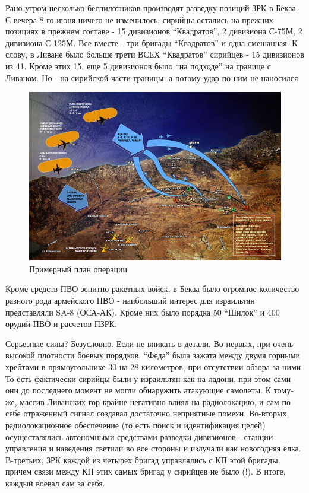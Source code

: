 Рано утром несколько беспилотников производят разведку позиций ЗРК в Бекаа. С вечера 8-го июня ничего не изменилось, сирийцы остались на прежних позициях в прежнем составе - 15 дивизионов “Квадратов”, 2 дивизиона С-75М, 2 дивизиона С-125М. Все вместе - три бригады “Квадратов” и одна смешанная. К слову, в Ливане было больше трети ВСЕХ “Квадратов” сирийцев - 15 дивизионов из 41. Кроме этих 15, еще 5 дивизионов было “на подходе” на границе с Ливаном. Но - на сирийской части границы, а потому удар по ним не наносился.

\begin{figure}[h!tb] 
	\centering\includegraphics[scale=0.3]{Bekaa_2/9zyt2hCclcQ.jpg}
	\caption{Примерный план операции}
\end{figure}	

Кроме средств ПВО зенитно-ракетных войск, в Бекаа было огромное количество разного рода армейского ПВО - наибольший интерес для израильтян представляли SA-8 (ОСА-АК). Кроме них было порядка 50 “Шилок” и 400 орудий ПВО и расчетов ПЗРК.

Серьезные силы? Безусловно. Если не вникать в детали. Во-первых, при очень высокой плотности боевых порядков, “Феда” была зажата между двумя горными хребтами в прямоугольнике 30 на 28 километров, при отсутствии обзора за ними. То есть фактически сирийцы были у израильтян как на ладони, при этом сами они до последнего момент не могли обнаружить атакующие самолеты. К тому-же, массив Ливанских гор крайне негативно влиял на радиолокацию, и сам по себе отраженный сигнал создавал достаточно неприятные помехи. Во-вторых, радиолокационное обеспечение (то есть поиск и идентификация целей) осуществлялись автономными средствами разведки дивизионов - станции управления и наведения светили во все стороны и излучали как новогодняя ёлка. В-третьих, ЗРК каждой из четырех бригад управлялись с КП этой бригады, причем связи между КП этих самых бригад у сирийцев не было (!). В итоге, каждый воевал сам за себя.

